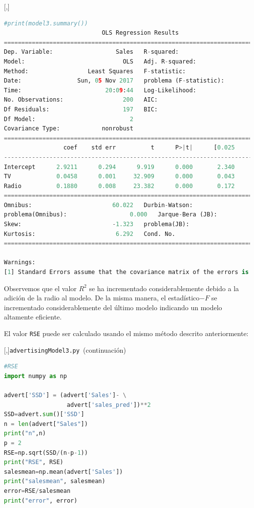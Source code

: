 [,]{}\tiny
\begin{lstlisting}[language=Python]
#print(model3.summary())
                            OLS Regression Results
==============================================================================
Dep. Variable:                  Sales   R-squared:                       0.897
Model:                            OLS   Adj. R-squared:                  0.896
Method:                 Least Squares   F-statistic:                     859.6
Date:                Sun, 05 Nov 2017   problema (F-statistic):           4.83e-98
Time:                        20:09:44   Log-Likelihood:                -386.20
No. Observations:                 200   AIC:                             778.4
Df Residuals:                     197   BIC:                             788.3
Df Model:                           2
Covariance Type:            nonrobust
==============================================================================
                 coef    std err          t      P>|t|      [0.025      0.975]
------------------------------------------------------------------------------
Intercept      2.9211      0.294      9.919      0.000       2.340       3.502
TV             0.0458      0.001     32.909      0.000       0.043       0.048
Radio          0.1880      0.008     23.382      0.000       0.172       0.204
==============================================================================
Omnibus:                       60.022   Durbin-Watson:                   2.081
problema(Omnibus):                  0.000   Jarque-Bera (JB):              148.679
Skew:                          -1.323   problema(JB):                     5.19e-33
Kurtosis:                       6.292   Cond. No.                         425.
==============================================================================

Warnings:
[1] Standard Errors assume that the covariance matrix of the errors is correctly specified.
\end{lstlisting}


Observemos que el valor $R^{2}$ se ha incrementado considerablemente debido a la adición de la radio al modelo. De la misma manera, el estadístico$-F$ se incrementado considerablemente del último modelo indicando un modelo altamente eficiente.


El valor \texttt{RSE} puede ser calculado usando el mismo método descrito anteriormente:

[,]{\texttt{advertisingModel3.py }(continuación)} \tiny
\begin{lstlisting}[language=Python]
#RSE
import numpy as np

advert['SSD'] = (advert['Sales']- \
                  advert['sales_pred'])**2
SSD=advert.sum()['SSD']
n = len(advert["Sales"])
print("n",n)
p = 2
RSE=np.sqrt(SSD/(n-p-1))
print("RSE", RSE)
salesmean=np.mean(advert['Sales'])
print("salesmean", salesmean)
error=RSE/salesmean
print("error", error)
\end{lstlisting}


